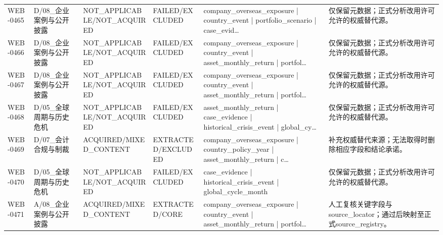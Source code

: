 \begin{landscape}
\begin{longtable}{p{1.8cm}p{2.6cm}p{2.6cm}p{2.6cm}p{4.8cm}p{7.2cm}}
WEB-0465 & D/\allowbreak{}08\_\allowbreak{}企业案例与公开披露 & NOT\_\allowbreak{}APPLICABLE/\allowbreak{}NOT\_\allowbreak{}ACQUIRED & FAILED/\allowbreak{}EXCLUDED & company\_\allowbreak{}overseas\_\allowbreak{}exposure | country\_\allowbreak{}event | portfolio\_\allowbreak{}scenario | case\_\allowbreak{}evid… & 仅保留元数据；正式分析改用许可允许的权威替代源。\\
WEB-0466 & D/\allowbreak{}08\_\allowbreak{}企业案例与公开披露 & NOT\_\allowbreak{}APPLICABLE/\allowbreak{}NOT\_\allowbreak{}ACQUIRED & FAILED/\allowbreak{}EXCLUDED & company\_\allowbreak{}overseas\_\allowbreak{}exposure | country\_\allowbreak{}event | asset\_\allowbreak{}monthly\_\allowbreak{}return | portfol… & 仅保留元数据；正式分析改用许可允许的权威替代源。\\
WEB-0467 & D/\allowbreak{}08\_\allowbreak{}企业案例与公开披露 & NOT\_\allowbreak{}APPLICABLE/\allowbreak{}NOT\_\allowbreak{}ACQUIRED & FAILED/\allowbreak{}EXCLUDED & company\_\allowbreak{}overseas\_\allowbreak{}exposure | country\_\allowbreak{}event | asset\_\allowbreak{}monthly\_\allowbreak{}return | portfol… & 仅保留元数据；正式分析改用许可允许的权威替代源。\\
WEB-0468 & D/\allowbreak{}05\_\allowbreak{}全球周期与历史危机 & NOT\_\allowbreak{}APPLICABLE/\allowbreak{}NOT\_\allowbreak{}ACQUIRED & FAILED/\allowbreak{}EXCLUDED & asset\_\allowbreak{}monthly\_\allowbreak{}return | case\_\allowbreak{}evidence | historical\_\allowbreak{}crisis\_\allowbreak{}event | global\_\allowbreak{}cy… & 仅保留元数据；正式分析改用许可允许的权威替代源。\\
WEB-0469 & D/\allowbreak{}07\_\allowbreak{}会计合规与制裁 & ACQUIRED/\allowbreak{}MIXED\_\allowbreak{}CONTENT & EXTRACTED/\allowbreak{}EXCLUDED & company\_\allowbreak{}overseas\_\allowbreak{}exposure | country\_\allowbreak{}policy\_\allowbreak{}year | asset\_\allowbreak{}monthly\_\allowbreak{}return | c… & 补充权威替代来源；无法取得时删除相应字段和结论承诺。\\
WEB-0470 & D/\allowbreak{}05\_\allowbreak{}全球周期与历史危机 & NOT\_\allowbreak{}APPLICABLE/\allowbreak{}NOT\_\allowbreak{}ACQUIRED & FAILED/\allowbreak{}EXCLUDED & case\_\allowbreak{}evidence | historical\_\allowbreak{}crisis\_\allowbreak{}event | global\_\allowbreak{}cycle\_\allowbreak{}month & 仅保留元数据；正式分析改用许可允许的权威替代源。\\
WEB-0471 & A/\allowbreak{}08\_\allowbreak{}企业案例与公开披露 & ACQUIRED/\allowbreak{}MIXED\_\allowbreak{}CONTENT & EXTRACTED/\allowbreak{}CORE & company\_\allowbreak{}overseas\_\allowbreak{}exposure | country\_\allowbreak{}event | asset\_\allowbreak{}monthly\_\allowbreak{}return | portfol… & 人工复核关键字段与source\_\allowbreak{}locator；通过后映射至正式source\_\allowbreak{}registry。\\

\end{longtable}
\end{landscape}
